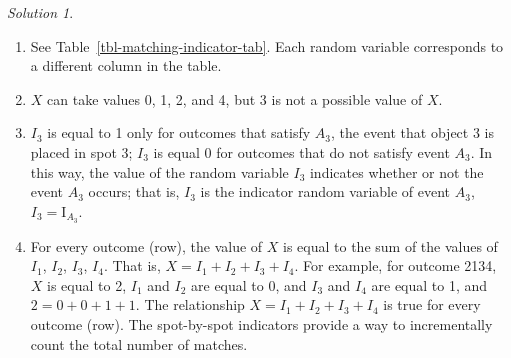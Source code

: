 \documentclass[
  letterpaper,
  DIV=11,
  numbers=noendperiod]{scrreprt}
\providecommand{\tightlist}{%
  \setlength{\itemsep}{0pt}\setlength{\parskip}{0pt}}
\theoremstyle{plain}
\theoremstyle{definition}
\theoremstyle{definition}
\theoremstyle{definition}
\theoremstyle{remark}
\newtheorem{refsolution}{Solution}[chapter]
\begin{document}
\begin{tcolorbox}[enhanced jigsaw, opacityback=0, rightrule=.15mm, coltitle=black, colframe=quarto-callout-tip-color-frame, toprule=.15mm, colbacktitle=quarto-callout-tip-color!10!white, opacitybacktitle=0.6, left=2mm, toptitle=1mm, breakable, title={Solution (click to expand)}, bottomtitle=1mm, colback=white, leftrule=.75mm, titlerule=0mm, arc=.35mm, bottomrule=.15mm]

\begin{refsolution}
\leavevmode

\begin{enumerate}
\def\labelenumi{\arabic{enumi}.}
\tightlist
\item
  See Table~\ref{tbl-matching-indicator-tab}. Each random variable
  corresponds to a different column in the table.
\item
  \(X\) can take values 0, 1, 2, and 4, but 3 is not a possible value of
  \(X\).
\item
  \(I_3\) is equal to 1 only for outcomes that satisfy \(A_3\), the
  event that object 3 is placed in spot 3; \(I_3\) is equal 0 for
  outcomes that do not satisfy event \(A_3\). In this way, the value of
  the random variable \(I_3\) indicates whether or not the event \(A_3\)
  occurs; that is, \(I_3\) is the indicator random variable of event
  \(A_3\), \(I_3 = \textrm{I}_{A_3}\).
\item
  For every outcome (row), the value of \(X\) is equal to the sum of the
  values of \(I_1\), \(I_2\), \(I_3\), \(I_4\). That is,
  \(X = I_1+I_2+I_3+I_4\). For example, for outcome 2134, \(X\) is equal
  to 2, \(I_1\) and \(I_2\) are equal to 0, and \(I_3\) and \(I_4\) are
  equal to 1, and \(2 = 0 + 0 + 1 + 1\). The relationship
  \(X = I_1+I_2+I_3+I_4\) is true for every outcome (row). The
  spot-by-spot indicators provide a way to incrementally count the total
  number of matches.
\end{enumerate}

\label{sol-matching-indicator}

\end{refsolution}

\end{tcolorbox}
\end{document}
